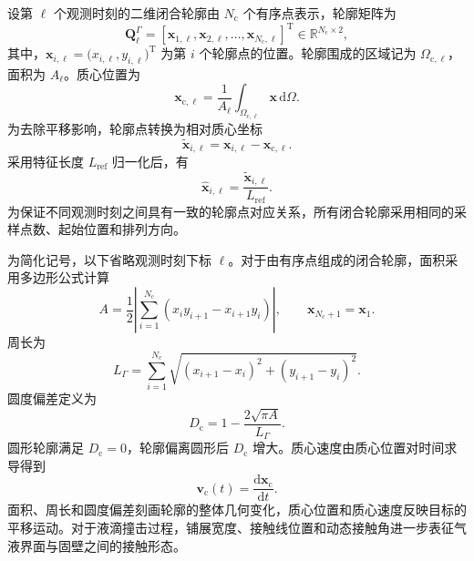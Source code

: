 设第 $\ell$ 个观测时刻的二维闭合轮廓由 $N_{\mathrm c}$ 个有序点表示，轮廓矩阵为
\begin{equation}
\boldsymbol{Q}_{\ell}^{\Gamma}
=
\left[
\boldsymbol{x}_{1,\ell},
\boldsymbol{x}_{2,\ell},
\ldots,
\boldsymbol{x}_{N_{\mathrm c},\ell}
\right]^{\mathrm T}
\in
\mathbb{R}^{N_{\mathrm c}\times2},
\label{eq:ch2_contour_matrix}
\end{equation}
其中，$\boldsymbol{x}_{i,\ell}=\bigl(x_{i,\ell},y_{i,\ell}\bigr)^{\mathrm T}$ 为第 $i$ 个轮廓点的位置。轮廓围成的区域记为 $\Omega_{\mathrm c,\ell}$，面积为 $A_{\ell}$。质心位置为
\begin{equation}
\boldsymbol{x}_{\mathrm c,\ell}
=
\frac{1}{A_{\ell}}
\int_{\Omega_{\mathrm c,\ell}}
\boldsymbol{x}\,\mathrm d\Omega.
\label{eq:ch2_centroid}
\end{equation}
为去除平移影响，轮廓点转换为相对质心坐标
\begin{equation}
\widetilde{\boldsymbol{x}}_{i,\ell}
=
\boldsymbol{x}_{i,\ell}
-
\boldsymbol{x}_{\mathrm c,\ell}.
\label{eq:ch2_centroid_alignment}
\end{equation}
采用特征长度 $L_{\mathrm{ref}}$ 归一化后，有
\begin{equation}
\widehat{\boldsymbol{x}}_{i,\ell}
=
\frac{\widetilde{\boldsymbol{x}}_{i,\ell}}
{L_{\mathrm{ref}}}.
\label{eq:ch2_contour_normalization}
\end{equation}
为保证不同观测时刻之间具有一致的轮廓点对应关系，所有闭合轮廓采用相同的采样点数、起始位置和排列方向。

为简化记号，以下省略观测时刻下标 $\ell$。对于由有序点组成的闭合轮廓，面积采用多边形公式计算
\begin{equation}
A
=
\frac{1}{2}
\left|
\sum_{i=1}^{N_{\mathrm c}}
\left(%
 x_i y_{i+1}-x_{i+1}y_i
\right)
\right|,
\qquad
\boldsymbol{x}_{N_{\mathrm c}+1}=\boldsymbol{x}_1.
\label{eq:ch2_polygon_area}
\end{equation}
周长为
\begin{equation}
L_{\Gamma}
=
\sum_{i=1}^{N_{\mathrm c}}
\sqrt{
\left(x_{i+1}-x_i\right)^2
+
\left(y_{i+1}-y_i\right)^2
}.
\label{eq:ch2_polygon_perimeter}
\end{equation}
圆度偏差定义为
\begin{equation}
D_{\mathrm c}
=
1-
\frac{2\sqrt{\pi A}}{L_{\Gamma}}.
\label{eq:ch2_circularity_deviation}
\end{equation}
圆形轮廓满足 $D_{\mathrm c}=0$，轮廓偏离圆形后 $D_{\mathrm c}$ 增大。质心速度由质心位置对时间求导得到
\begin{equation}
\boldsymbol{v}_{\mathrm c}(t)
=
\frac{\mathrm d\boldsymbol{x}_{\mathrm c}}{\mathrm dt}.
\label{eq:ch2_centroid_velocity}
\end{equation}
面积、周长和圆度偏差刻画轮廓的整体几何变化，质心位置和质心速度反映目标的平移运动。对于液滴撞击过程，铺展宽度、接触线位置和动态接触角进一步表征气液界面与固壁之间的接触形态。

